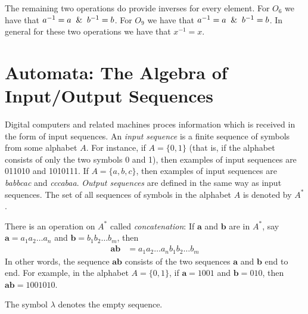 \documentclass[draft,twoside]{amsart}
\begin{document}
\begin{enumerate}
   The remaining two operations do
   provide inverses for every element. For $O_6$ we have that 
   $a^{-1} = a \And b^{-1} = b$. For $O_9$ we have that 
   $a^{-1} = a \And b^{-1} = b$. In general for these two operations
   we have that $x^{-1} = x$.

\end{enumerate}

\section{Automata: The Algebra of Input/Output Sequences}
Digital computers and related machines proces information which is received in
the form of input sequences. An \emph{input sequence} is a finite sequence of
symbols from some alphabet $A$. For instance, if $A=\{0,1\}$ (that is, if the
alphabet consists of only the two symbols 0 and 1), then examples of input
sequences are 011010 and 1010111. If $A=\{a,b,c\}$, then examples of input
sequences are \emph{babbcac} and \emph{cccabaa}. \emph{Output sequences} are
defined in the same way as input sequences. The set of all sequences of symbols
in the alphabet $A$ is denoted by $A^*$.

There is an operation on $A^*$ called \emph{concatenation}: If $\mathbf{a}$ and
$\mathbf{b}$ are in $A^*$, say $\mathbf{a} = a_1 a_2 \ldots a_n$ and
$\mathbf{b} = b_1 b_2 \ldots b_m$, then \begin{align*} \mathbf{ab} & = a_1 a_2
\ldots a_n b_1 b_2 \ldots b_m \end{align*} In other words, the sequence
$\mathbf{ab}$ consists of the two sequences $\mathbf{a}$ and $\mathbf{b}$ end
to end.  For example, in the alphabet $A=\{0,1\}$, if $\mathbf{a} = 1001$ and
$\mathbf{b} = 010$, then $\mathbf{ab} = 1001010$.

The symbol $\lambda$ denotes the empty sequence.
\end{document}
